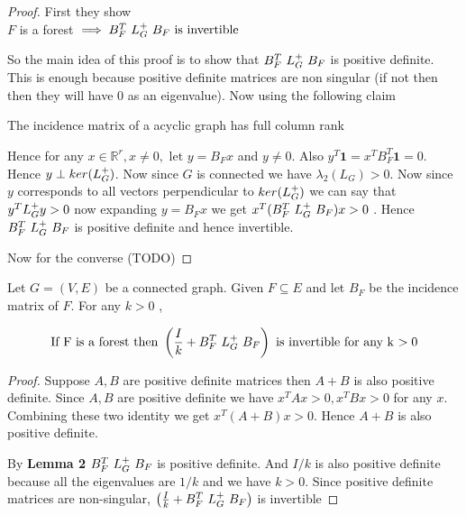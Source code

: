 \begin{proof}
First they show \\ 
$ F$ is a forest $\implies B_F^T \ L_{G}^{+} \ B_F \ \text{is invertible}$ 

So the main idea of this proof is to show that $B_F^T \ \laplacian \ B_F $ is positive definite. This is enough because positive definite matrices are non singular (if not then then they will have 0 as an eigenvalue). Now using the following claim
 
 \begin{HXcl}
  The incidence matrix of a acyclic graph has full column rank
 \end{HXcl}
    
Hence for any $x \in \mathbb{R}^r, x \neq 0, \text{ let } y = B_F x$ and $y \neq 0$. Also $y^T \textbf{1} = x^T B_F^T \textbf{1} = 0$. Hence $y \perp ker(L_{G}^{+})$. Now since $G$ is connected we have $\lambda_2(L_G) > 0$. Now since $y$ corresponds to all vectors perpendicular to $ker(L_{G}^{+})$ we can say that $y^T L_{G}^{+} y > 0$ now expanding $y = B_F x$ we get $x^T (B_F^T \ L_{G}^{+} \ B_F) x > 0$ . Hence $B_F^T \ \laplacian \ B_F$ is positive definite and hence invertible. 

Now for the converse (TODO)
\end{proof}


\begin{HXl}
 Let $G = (V, E)$ be a connected graph. Given $F \subseteq E$ and let $B_F$ be the incidence matrix of $F$. For any $k > 0$ , 
 
 $$\text{If F is a forest then } \left( \frac{I}{k} +  B_F^T \ L_{G}^{+} \ B_F \right) \ \text{is invertible for any k $> 0$}$$
\end{HXl}

\begin{proof}
 Suppose $A, B$ are positive definite matrices then $A + B$ is also positive definite. Since $A, B$ are positive definite we have $x^T A x > 0 , x^T B x > 0$ for any $x$. Combining these two identity we get $x^T (A + B) x > 0$. Hence $A + B$ is also positive definite.
 
 By \textbf{Lemma 2} $B_F^T \ \laplacian \ B_F$ is positive definite. And $I/k$ is also positive definite because all the eigenvalues are $1/k$ and we have $k > 0$. Since positive definite matrices are non-singular, $\left( \frac{I}{k} +  B_F^T \ L_{G}^{+} \ B_F \right)$ is invertible
\end{proof}


